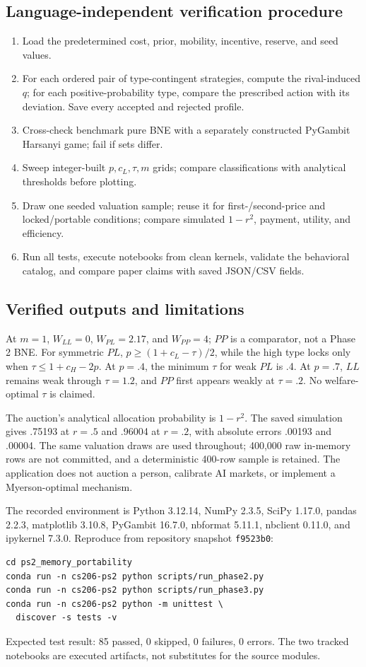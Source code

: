 \subsection{Language-independent verification procedure}
\begin{enumerate}
\item Load the predetermined cost, prior, mobility, incentive, reserve, and seed values.
\item For each ordered pair of type-contingent strategies, compute the rival-induced $q$; for each positive-probability type, compare the prescribed action with its deviation. Save every accepted and rejected profile.
\item Cross-check benchmark pure BNE with a separately constructed PyGambit Harsanyi game; fail if sets differ.
\item Sweep integer-built $p,c_L,\tau,m$ grids; compare classifications with analytical thresholds before plotting.
\item Draw one seeded valuation sample; reuse it for first-/second-price and locked/portable conditions; compare simulated $1-r^2$, payment, utility, and efficiency.
\item Run all tests, execute notebooks from clean kernels, validate the behavioral catalog, and compare paper claims with saved JSON/CSV fields.
\end{enumerate}

\subsection{Verified outputs and limitations}
At $m=1$, $W_{LL}=0$, $W_{PL}=2.17$, and $W_{PP}=4$; $PP$ is a comparator, not a Phase 2 BNE. For symmetric $PL$, $p\ge(1+c_L-\tau)/2$, while the high type locks only when $\tau\le1+c_H-2p$. At $p=.4$, the minimum $\tau$ for weak $PL$ is .4. At $p=.7$, $LL$ remains weak through $\tau=1.2$, and $PP$ first appears weakly at $\tau=.2$. No welfare-optimal $\tau$ is claimed.

The auction's analytical allocation probability is $1-r^2$. The saved simulation gives .75193 at $r=.5$ and .96004 at $r=.2$, with absolute errors .00193 and .00004. The same valuation draws are used throughout; 400,000 raw in-memory rows are not committed, and a deterministic 400-row sample is retained. The application does not auction a person, calibrate AI markets, or implement a Myerson-optimal mechanism.

The recorded environment is Python 3.12.14, NumPy 2.3.5, SciPy 1.17.0, pandas 2.2.3, matplotlib 3.10.8, PyGambit 16.7.0, nbformat 5.11.1, nbclient 0.11.0, and ipykernel 7.3.0. Reproduce from repository snapshot \texttt{f9523b0}:
\begin{verbatim}
cd ps2_memory_portability
conda run -n cs206-ps2 python scripts/run_phase2.py
conda run -n cs206-ps2 python scripts/run_phase3.py
conda run -n cs206-ps2 python -m unittest \
  discover -s tests -v
\end{verbatim}
Expected test result: 85 passed, 0 skipped, 0 failures, 0 errors. The two tracked notebooks are executed artifacts, not substitutes for the source modules.

